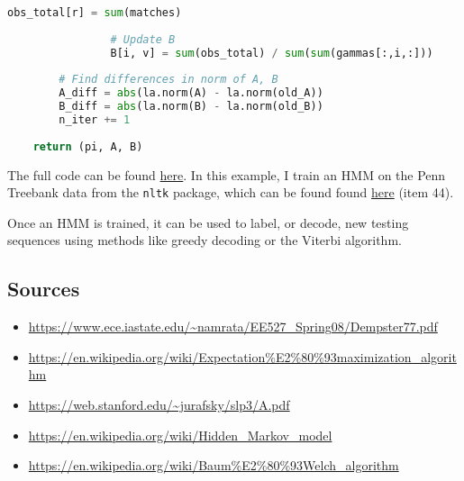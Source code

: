 \documentclass[14pt]{article}
\begin{document}
\begin{lstlisting}[language=Python]
                    obs_total[r] = sum(matches)
                    
                # Update B
                B[i, v] = sum(obs_total) / sum(sum(gammas[:,i,:]))
        
        # Find differences in norm of A, B
        A_diff = abs(la.norm(A) - la.norm(old_A))
        B_diff = abs(la.norm(B) - la.norm(old_B))
        n_iter += 1
            
    return (pi, A, B)
\end{lstlisting}

The full code can be found \href{https://github.com/MirandaRintoul/539-technical-tutorial/blob/main/em_nlp.py}{here}.  In this example, I train an HMM on the Penn Treebank data from the \texttt{nltk} package, which can be found found \href{https://www.nltk.org/nltk_data/}{here} (item 44).

Once an HMM is trained, it can be used to label, or decode, new testing sequences using methods like greedy decoding or the Viterbi algorithm.

\begin{center}
\subsection*{Sources}
\end{center}

\begin{itemize}
\item \url{https://www.ece.iastate.edu/~namrata/EE527_Spring08/Dempster77.pdf}
\item \url{https://en.wikipedia.org/wiki/Expectation%E2%80%93maximization_algorithm}
\item \url{https://web.stanford.edu/~jurafsky/slp3/A.pdf}
\item \url{https://en.wikipedia.org/wiki/Hidden_Markov_model}
\item \url{https://en.wikipedia.org/wiki/Baum%E2%80%93Welch_algorithm}
\end{itemize}
\end{document}
